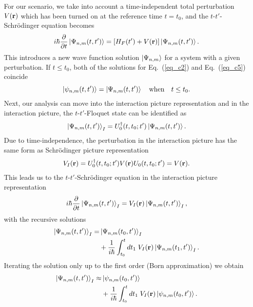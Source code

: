For our scenario, we take into account a time-independent total perturbation $V(\vb{r})$ which has been turned on at the reference time $t=t_0$, and the $t$-$t'$-Schrödinger equation becomes
\begin{equation} \label{eq_c5}
  i \hbar \pdv{t}\ket{\Psi_{n,m}(t,t')} =
  \qty[H_F(t') + V(\vb{r})]\ket{\Psi_{n,m}(t,t')}.
\end{equation}
This introduces a new wave function solution $\ket{\Psi_{n,m}}$ for a system with a given perturbation. If $t\leq t_0$, both of the solutions for Eq.~(\ref{eq_c2}) and Eq.~(\ref{eq_c5}) coincide
\begin{equation} \label{eq_c6}
  \ket{\psi_{n,m}(t,t')} =\ket{\Psi_{n,m}(t,t')} \quad
  \text{when} \quad
  t \leq t_0.
\end{equation}
Next, our analysis can move into the interaction picture representation \cite{bruus04,mahan00} and in the interaction picture, the $t$-$t'$-Floquet state can be identified as
\begin{equation} \label{eq_c7}
  \ket{\Psi_{n,m}(t,t')}_I = U_0^{\dagger}(t,t_0;t')
  \ket{\Psi_{n,m}(t,t')}.
\end{equation}
Due to time-independence, the perturbation in the interaction picture has the same form as Schrödinger picture representation
\begin{equation} \label{eq_c8}
  V_I(\vb{r}) = U_0^{\dagger}(t,t_0;t')V(\vb{r})U_0(t,t_0;t') =
  V(\vb{r}).
\end{equation}
This leads us to the $t$-$t'$-Schrödinger equation in the interaction picture representation
\begin{equation} \label{eq_c9}
  i \hbar \pdv{t}\ket{\Psi_{n,m}(t,t')}_I =
  V_I(\vb{r})\ket{\Psi_{n,m}(t,t')}_I,
\end{equation}
with the recursive solutions \cite{bruus04,mahan00}
\begin{equation} \label{eq_c10}
  \begin{aligned}
  \ket{\Psi_{n,m}(t,t')}_I = &\ket{\Psi_{n,m}(t_0,t')}_I \\
  &+
  \frac{1}{i\hbar}
  \int_{t_0}^t dt_1 \;
  V_I(\vb{r}) \ket{\Psi_{n,m}(t_1,t')}_I.
  \end{aligned}
\end{equation}
Iterating the solution only up to the first order (Born approximation) we obtain
\begin{equation} \label{eq_c11}
  \begin{aligned}
    \ket{\Psi_{n,m}(t,t')}_I \approx &\ket{\psi_{n,m}(t_0,t')} \\
    &+
    \frac{1}{i\hbar}
    \int_{t_0}^t dt_1 \;
    V_I(\vb{r}) \ket{\psi_{n,m}(t_0,t')}.
  \end{aligned}
\end{equation}

